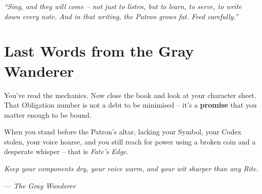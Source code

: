 \documentclass[10pt,a5paper]{book}
\begin{document}
\noindent \textit{“Sing, and they will come – not just to listen, but to learn, to serve, to write down every note. And in that writing, the Patron grows fat. Feed carefully.”}

\clearpage

\chapter{Last Words from the Gray Wanderer}

You’ve read the mechanics. Now close the book and look at your character sheet. That Obligation number is not a debt to be minimised – it’s a \textbf{promise} that you matter enough to be bound.

When you stand before the Patron’s altar, lacking your Symbol, your Codex stolen, your voice hoarse, and you still reach for power using a broken coin and a desperate whisper – that is \textit{Fate's Edge}.

\vspace{1cm}
\noindent \textit{Keep your components dry, your voice warm, and your wit sharper than any Rite.}

\vspace{0.5cm}
\hfill — \textit{The Gray Wanderer}
\end{document}

